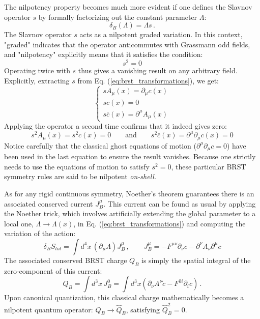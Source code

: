 The nilpotency property becomes much more evident if one defines the Slavnov operator \(s\) by formally factorizing out the constant parameter \(\Lambda\):
\begin{equation} \label{eq:slavnov_definition}
    \delta_B(\Lambda) = \Lambda s \, .
\end{equation}
The Slavnov operator \(s\) acts as a nilpotent graded variation. In this context, "graded" indicates that the operator anticommutes with Grassmann odd fields, and "nilpotency" explicitly means that it satisfies the condition:
\begin{equation} \label{eq:slavnov_nilpotency}
    s^2 = 0
\end{equation}
Operating twice with \(s\) thus gives a vanishing result on any arbitrary field. Explicitly, extracting \(s\) from Eq. (\ref{eq:brst_transformations}), we get:
\begin{equation} \label{eq:slavnov_explicit}
    \begin{cases}
        s A_\mu(x) = \partial_\mu c(x) \\
        s c(x) = 0                     \\
        s \bar{c}(x) = \partial^\mu A_\mu(x)
    \end{cases}
\end{equation}
Applying the operator a second time confirms that it indeed gives zero:
\begin{equation} \label{eq:slavnov_squared}
    s^2 A_\mu(x) = s^2 c(x) = 0 \qquad \text{and} \qquad s^2 \bar{c}(x) = \partial^\mu \partial_\mu c(x) = 0
\end{equation}
Notice carefully that the classical ghost equations of motion (\(\partial^\mu \partial_\mu c = 0\)) have been used in the last equation to ensure the result vanishes. Because one strictly needs to use the equations of motion to satisfy \(s^2=0\), these particular BRST symmetry rules are said to be nilpotent \textit{on-shell}.

As for any rigid continuous symmetry, Noether's theorem guarantees there is an associated conserved current \(J_B^\mu\). This current can be found as usual by applying the Noether trick, which involves artificially extending the global parameter to a local one, \(\Lambda \rightarrow \Lambda(x)\), in Eq. (\ref{eq:brst_transformations}) and computing the variation of the action:
\begin{equation} \label{eq:brst_current}
    \delta_B S_{tot} = \int d^4x \, (\partial_\mu \Lambda) J_B^\mu \, , \qquad J_B^\mu = -F^{\mu\nu}\partial_\nu c - \partial^\nu A_\nu \partial^\mu c
\end{equation}
The associated conserved BRST charge \(Q_B\) is simply the spatial integral of the zero-component of this current:
\begin{equation} \label{eq:brst_charge}
    Q_B = \int d^3x \, J_B^0 = \int d^3x \left( \partial_\nu A^\nu \dot{c} - F^{0i}\partial_i c \right) \, .
\end{equation}
Upon canonical quantization, this classical charge mathematically becomes a nilpotent quantum operator: \(Q_B \rightarrow \hat{Q}_B\), satisfying \(\hat{Q}_B^2 = 0\).

